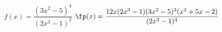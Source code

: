 {$f(x) = \dfrac {(3x^2 - 5)^4}{(2x^3-1)^2}$
}
{$\fp(x) = \dfrac {12x(2x^3-1)(3x^2 - 5)^3(x^2+5x-2)}{(2x^3-1)^4}$
}
